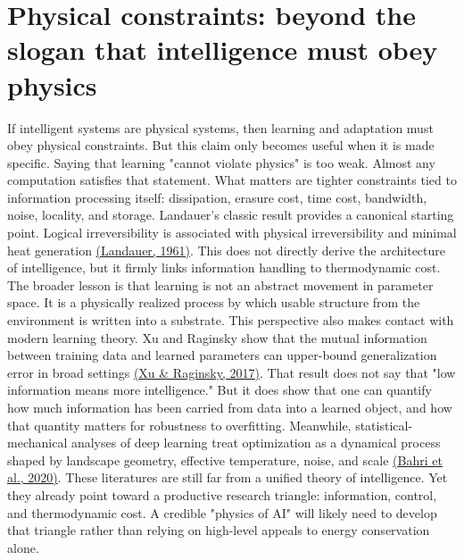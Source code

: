 \documentclass[11pt]{article}
\newcommand{\citejump}[2]{\hyperref[#1]{(#2)}}
\begin{document}
\section{Physical constraints: beyond the slogan that intelligence must obey physics}
If intelligent systems are physical systems, then learning and adaptation must obey physical constraints. But this claim only becomes useful when it is made specific. Saying that learning "cannot violate physics" is too weak. Almost any computation satisfies that statement. What matters are tighter constraints tied to information processing itself: dissipation, erasure cost, time cost, bandwidth, noise, locality, and storage. Landauer's classic result provides a canonical starting point. Logical irreversibility is associated with physical irreversibility and minimal heat generation \citejump{ref:landauer1961}{Landauer, 1961}. This does not directly derive the architecture of intelligence, but it firmly links information handling to thermodynamic cost. The broader lesson is that learning is not an abstract movement in parameter space. It is a physically realized process by which usable structure from the environment is written into a substrate. This perspective also makes contact with modern learning theory. Xu and Raginsky show that the mutual information between training data and learned parameters can upper-bound generalization
error in broad settings \citejump{ref:xu2017}{Xu \& Raginsky, 2017}. That result does not say that "low information means more intelligence." But it does show that one can quantify how much information has been carried from data into a learned object, and how that quantity matters for robustness to overfitting. Meanwhile, statistical-mechanical analyses of deep learning treat optimization as a dynamical process shaped by landscape geometry, effective temperature, noise, and scale \citejump{ref:bahri2020}{Bahri et al., 2020}. These literatures are still far from a unified theory of intelligence. Yet they already point toward a productive research triangle: information, control, and thermodynamic cost. A credible "physics of AI" will likely need to develop that triangle rather than relying on high-level appeals to energy conservation alone.
\end{document}
